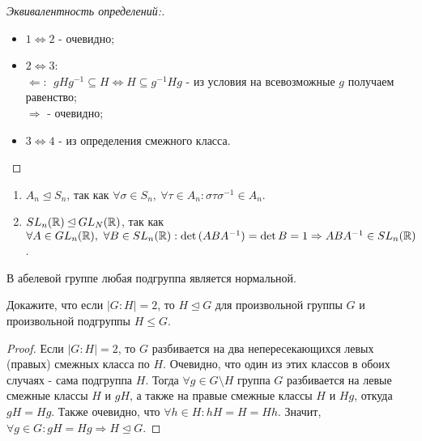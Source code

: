 \begin{proof}[Эквивалентность определений:]\tab
    \begin{itemize}
        \item $1 \Longleftrightarrow 2$ - очевидно;
        \item $2 \Longleftrightarrow 3$:\\
        $\Longleftarrow: \ \ gHg^{-1} \subseteq H \Leftrightarrow H \subseteq g^{-1}Hg$ - из условия на всевозможные $g$ получаем равенство;\\
        $\Longrightarrow$ - очевидно;
        \item $3 \Longleftrightarrow 4$ - из определения смежного класса.
    \end{itemize}
\end{proof}
\begin{examples} \tab
    \begin{enumerate}
        \item $A_n \unlhd S_n$, так как $\forall \sigma\in S_n,\ \forall \tau\in A_n: \sigma\tau\sigma^{-1}\in A_n$.
        \item $SL_n(\mathbb{R})\unlhd GL_N(\mathbb{R})$, так как $\forall A\in GL_n(\mathbb{R}),\ \forall B\in SL_n(\mathbb{R}): \det{(ABA^{-1})}=\det{B}=1 \Rightarrow ABA^{-1}\in SL_n(\mathbb{R})$.
    \end{enumerate}
\end{examples}
\begin{subtheorem}
    В абелевой группе любая подгруппа является нормальной.
\end{subtheorem}
\begin{exercise}
    Докажите, что если $|G:H|=2$, то $H\unlhd G$ для произвольной группы $G$ и произвольной подгруппы $H\leq G$.
\end{exercise}
\begin{proof}
    Если $|G:H|=2$, то $G$ разбивается на два непересекающихся левых (правых) смежных класса по $H$. Очевидно, что один из этих классов  в обоих случаях - сама подгруппа $H$. Тогда $\forall g \in G \setminus H$ группа $G$ разбивается на левые смежные классы $H$ и $gH$, а также на правые смежные классы $H$ и $Hg$, откуда $gH = Hg$. Также очевидно, что $\forall h \in H: hH = H = Hh$. Значит, $\forall g \in G: gH = Hg \Longrightarrow H \unlhd G$.
\end{proof}

